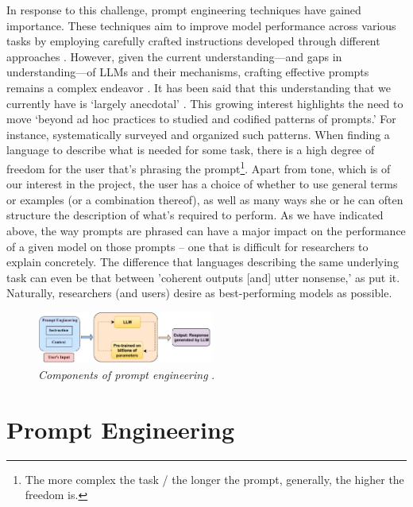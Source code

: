 \documentclass[11pt]{article}
\begin{document}
In response to this challenge, prompt engineering techniques have gained importance. These techniques aim to improve model performance across various tasks by employing carefully crafted instructions developed through different approaches \citet{sahoo24-prompt-survey}. However, given the current understanding—and gaps in understanding—of LLMs and their mechanisms, crafting effective prompts remains a complex endeavor \citet{bommasani22-foundation-models}. It has been said that this understanding that we currently have is `largely anecdotal' \citep{schmidt24-prompt-catalog}. This growing interest highlights the need to move `beyond ad hoc practices to studied and codified patterns of prompts.' For instance, \citet{sahoo24-prompt-survey} systematically surveyed and organized such patterns.
When finding a language to describe what is needed for some task, there is a high degree of freedom for the user that's phrasing the prompt\footnote{The more complex the task / the longer the prompt, generally, the higher the freedom is.}. Apart from tone, which is of our interest in the project, the user has a choice of whether to use general terms or examples (or a combination thereof), as well as many ways she or he can often structure the description of what's required to perform. As we have indicated above, the way prompts are phrased can have a major impact on the performance of a given model on those prompts -- one that is difficult for researchers to explain concretely. The difference that languages describing the same underlying task can even be that between 'coherent outputs [and] utter nonsense,' as \citet{bommasani22-foundation-models} put it. Naturally, researchers (and users) desire as best-performing models as possible.

\begin{figure}[h!]
    \centering
    \includegraphics[width=0.52\textwidth]{prompt-engineering-concept.pdf}
    \caption{\textit{Components of prompt engineering} \citep{sahoo24-prompt-survey}.}
    \label{fig:prompt-engineering-visualized}
\end{figure}
 
\section{Prompt Engineering}
\end{document}
